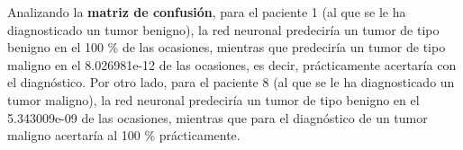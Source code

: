\documentclass [a4paper] {article}
\begin{document}
Analizando la \textbf{matriz de confusión}, para el paciente 1 (al que se le ha diagnosticado un tumor benigno), la red neuronal predeciría un tumor de tipo benigno en el 100 \% de las ocasiones, mientras que predeciría un tumor de tipo maligno en el 8.026981e-12 de las ocasiones, es decir, prácticamente acertaría con el diagnóstico. Por otro lado, para el paciente 8 (al que se le ha diagnosticado un tumor maligno), la red neuronal predeciría un tumor de tipo benigno en el 5.343009e-09 de las ocasiones, mientras que para el diagnóstico de un tumor maligno acertaría al 100 \% prácticamente.
\end{document}
